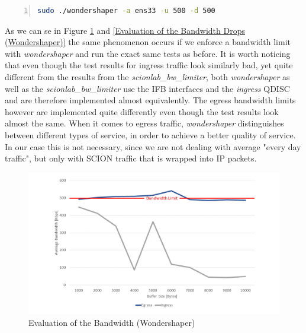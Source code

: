 \begin{lstlisting}[language=sh, caption = Wondershaper command, captionpos=b, numbers=left, frame=single, breaklines=true, breakatwhitespace=true, showstringspaces=false, label=Wondershaper command]
sudo ./wondershaper -a ens33 -u 500 -d 500
\end{lstlisting}

As we can se in Figure \ref{Evaluation of the Bandwidth (Wondershaper)} and \ref{Evaluation of the Bandwidth Drops (Wondershaper)} the same phenomenon occurs if we enforce a bandwidth limit with \textit{wondershaper} and run the exact same tests as before. It is worth noticing that even though the test results for ingress traffic look similarly bad, yet quite different from the results from the \textit{scionlab\_bw\_limiter}, both \textit{wondershaper} as well as the \textit{scionlab\_bw\_limiter} use the \acs{IFB} interfaces and the \textit{ingress} \acs{QDISC} and are therefore implemented almost equivalently. The egress bandwidth limits however are implemented quite differently even though the test results look almost the same. When it comes to egress traffic, \textit{wondershaper} distinguishes between different types of service, in order to achieve a better quality of service. In our case this is not necessary, since we are not dealing with average "every day traffic", but only with \acs{SCION} traffic that is wrapped into \acs{IP} packets.  

\begin{figure}[h]
	\centering
	\includegraphics[width=\textwidth]{img/Evaluation-Bandwidth-Wondershaper.png}
	\caption{Evaluation of the Bandwidth (Wondershaper)}
	\label{Evaluation of the Bandwidth (Wondershaper)}
\end{figure}

